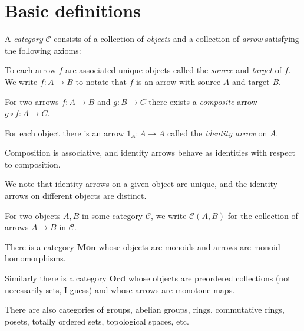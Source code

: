 \documentclass[article, a4paper, 11pt, oneside]{memoir}
\title{\doctitle}
\author{\docauthor}
\numberwithin{equation}{chapter}
\newcommand{\cat}[1]{\mathcal{#1}}
\newcommand{\ncat}[1]{\mathbf{#1}} %
\newcommand{\catMon}{\ncat{Mon}}
\newcommand{\catOrd}{\ncat{Ord}}
\newcommand{\catC}{\cat{C}}
\theoremstyle{myexample}
\theoremstyle{myexamplebreak}
\begin{document}
\maketitle

\chapter{Basic definitions}

\begin{definition}[Categories]
    A \emph{category} $\catC$ consists of a collection of \emph{objects} and a collection of \emph{arrow} satisfying the following axioms:
    \begin{enumdef}
        \item To each arrow $f$ are associated unique objects called the \emph{source} and \emph{target} of $f$. We write $f \colon A \to B$ to notate that $f$ is an arrow with source $A$ and target $B$.
        
        \item For two arrows $f \colon A \to B$ and $g \colon B \to C$ there exists a \emph{composite} arrow $g \circ f \colon A \to C$.
        
        \item For each object there is an arrow $1_A \colon A \to A$ called the \emph{identity arrow} on $A$.
        
        \item Composition is associative, and identity arrows behave as identities with respect to composition.
    \end{enumdef}
\end{definition}
%
We note that identity arrows on a given object are unique, and the identity arrows on different objects are distinct.

For two objects $A,B$ in some category $\catC$, we write $\catC(A,B)$ for the collection of arrows $A \to B$ in $\catC$.%

\begin{examplebreak}
    \begin{enumexample}
        \item \label{test} There is a category $\catMon$ whose objects are monoids and arrows are monoid homomorphisms.
        
        \item Similarly there is a category $\catOrd$ whose objects are preordered collections (not necessarily sets, I guess) and whose arrows are monotone maps.
        
        \item There are also categories of groups, abelian groups, rings, commutative rings, posets, totally ordered sets, topological spaces, etc.
    \end{enumexample}
\end{examplebreak}
\end{document}
